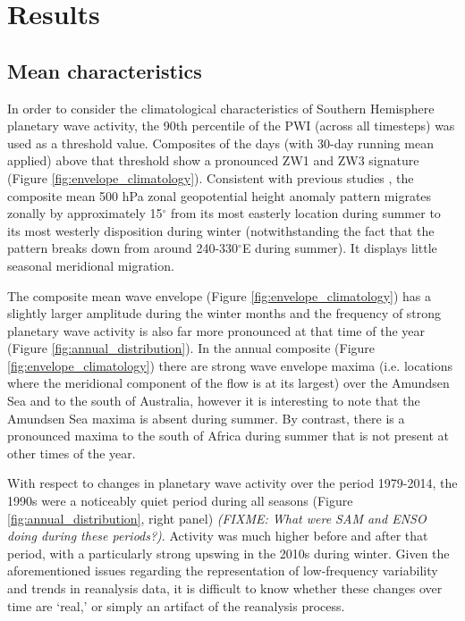 \section{Results}

\subsection{Mean characteristics}

In order to consider the climatological characteristics of Southern Hemisphere planetary wave activity, the 90th percentile of the PWI (across all timesteps) was used as a threshold value. Composites of the days (with 30-day running mean applied) above that threshold show a pronounced ZW1 and ZW3 signature (Figure \ref{fig:envelope_climatology}). Consistent with previous studies \citep{vanLoon1984,Mo1985}, the composite mean 500 hPa zonal geopotential height anomaly pattern migrates zonally by approximately 15$^{\circ}$ from its most easterly location during summer to its most westerly disposition during winter (notwithstanding the fact that the pattern breaks down from around 240-330$^{\circ}$E during summer). It displays little seasonal meridional migration.

The composite mean wave envelope (Figure \ref{fig:envelope_climatology}) has a slightly larger amplitude during the winter months and the frequency of strong planetary wave activity is also far more pronounced at that time of the year (Figure \ref{fig:annual_distribution}). In the annual composite (Figure \ref{fig:envelope_climatology}) there are strong wave envelope maxima (i.e. locations where the meridional component of the flow is at its largest) over the Amundsen Sea and to the south of Australia, however it is interesting to note that the Amundsen Sea maxima is absent during summer. By contrast, there is a pronounced maxima to the south of Africa during summer that is not present at other times of the year.

With respect to changes in planetary wave activity over the period 1979-2014, the 1990s were a noticeably quiet period during all seasons (Figure \ref{fig:annual_distribution}, right panel) \textit{(FIXME: What were SAM and ENSO doing during these periods?)}. Activity was much higher before and after that period, with a particularly strong upswing in the 2010s during winter. Given the aforementioned issues regarding the representation of low-frequency variability and trends in reanalysis data, it is difficult to know whether these changes over time are `real,' or simply an artifact of the reanalysis process.
